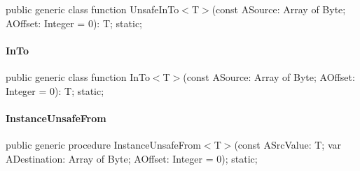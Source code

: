 \documentclass{report}
\begin{document}
\begin{list}{}{
\setlength{\itemindent}{0cm}
\setlength{\listparindent}{0cm}
\setlength{\leftmargin}{\evensidemargin}
\addtolength{\leftmargin}{\tmplength}
\settowidth{\labelsep}{X}
\addtolength{\leftmargin}{\labelsep}
\setlength{\labelwidth}{\tmplength}
}
\begin{flushleft}
\item[\textbf{Declaration}\hfill]
\begin{ttfamily}
public generic class function UnsafeInTo{$<$}T{$>$}(const ASource: Array of Byte; AOffset: Integer = 0): T; static;\end{ttfamily}


\end{flushleft}
\end{list}
\paragraph*{InTo}\hspace*{\fill}

\begin{list}{}{
\setlength{\itemindent}{0cm}
\setlength{\listparindent}{0cm}
\setlength{\leftmargin}{\evensidemargin}
\addtolength{\leftmargin}{\tmplength}
\settowidth{\labelsep}{X}
\addtolength{\leftmargin}{\labelsep}
\setlength{\labelwidth}{\tmplength}
}
\begin{flushleft}
\item[\textbf{Declaration}\hfill]
\begin{ttfamily}
public generic class function InTo{$<$}T{$>$}(const ASource: Array of Byte; AOffset: Integer = 0): T; static;\end{ttfamily}


\end{flushleft}
\end{list}
\paragraph*{InstanceUnsafeFrom}\hspace*{\fill}

\begin{list}{}{
\setlength{\itemindent}{0cm}
\setlength{\listparindent}{0cm}
\setlength{\leftmargin}{\evensidemargin}
\addtolength{\leftmargin}{\tmplength}
\settowidth{\labelsep}{X}
\addtolength{\leftmargin}{\labelsep}
\setlength{\labelwidth}{\tmplength}
}
\begin{flushleft}
\item[\textbf{Declaration}\hfill]
\begin{ttfamily}
public generic procedure InstanceUnsafeFrom{$<$}T{$>$}(const ASrcValue: T; var ADestination: Array of Byte; AOffset: Integer = 0); static;\end{ttfamily}


\end{flushleft}
\end{list}
\end{document}
